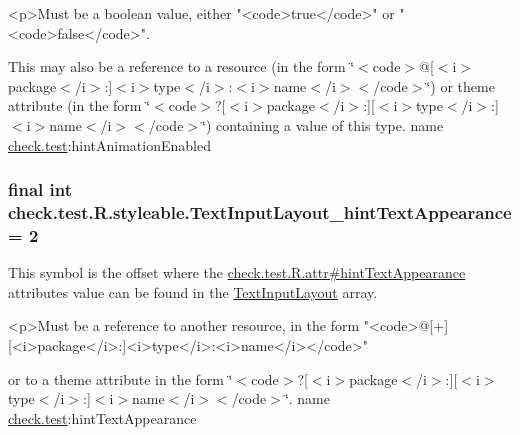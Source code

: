 \begin{DoxyVerb}      <p>Must be a boolean value, either "<code>true</code>" or "<code>false</code>".
\end{DoxyVerb}
 

This may also be a reference to a resource (in the form \char`\"{}$<$code$>$@\mbox{[}$<$i$>$package$<$/i$>$\+:\mbox{]}$<$i$>$type$<$/i$>$\+:$<$i$>$name$<$/i$>$$<$/code$>$\char`\"{}) or theme attribute (in the form \char`\"{}$<$code$>$?\mbox{[}$<$i$>$package$<$/i$>$\+:\mbox{]}\mbox{[}$<$i$>$type$<$/i$>$\+:\mbox{]}$<$i$>$name$<$/i$>$$<$/code$>$\char`\"{}) containing a value of this type.  name \hyperlink{namespacecheck_1_1test}{check.\+test}\+:hint\+Animation\+Enabled \hypertarget{classcheck_1_1test_1_1_r_1_1styleable_a9604a717bdd44907e80a794e886f45cb}{}
\subsubsection[{Text\+Input\+Layout\+\_\+hint\+Text\+Appearance}]{\setlength{\rightskip}{0pt plus 5cm}final int check.\+test.\+R.\+styleable.\+Text\+Input\+Layout\+\_\+hint\+Text\+Appearance = 2\hspace{0.3cm}{\ttfamily [static]}}\label{classcheck_1_1test_1_1_r_1_1styleable_a9604a717bdd44907e80a794e886f45cb}
This symbol is the offset where the \hyperlink{classcheck_1_1test_1_1_r_1_1attr_ad43181e17e280e930e2c2f62ba67cd24}{check.\+test.\+R.\+attr\#hint\+Text\+Appearance} attribute\textquotesingle{}s value can be found in the \hyperlink{classcheck_1_1test_1_1_r_1_1styleable_a56e445e43589d92521fa1b8fd6e2e470}{Text\+Input\+Layout} array.

\begin{DoxyVerb}      <p>Must be a reference to another resource, in the form "<code>@[+][<i>package</i>:]<i>type</i>:<i>name</i></code>"
\end{DoxyVerb}
 or to a theme attribute in the form \char`\"{}$<$code$>$?\mbox{[}$<$i$>$package$<$/i$>$\+:\mbox{]}\mbox{[}$<$i$>$type$<$/i$>$\+:\mbox{]}$<$i$>$name$<$/i$>$$<$/code$>$\char`\"{}.  name \hyperlink{namespacecheck_1_1test}{check.\+test}\+:hint\+Text\+Appearance \hypertarget{classcheck_1_1test_1_1_r_1_1styleable_acca726d02016a0cf607782ec3a436a81}{}
